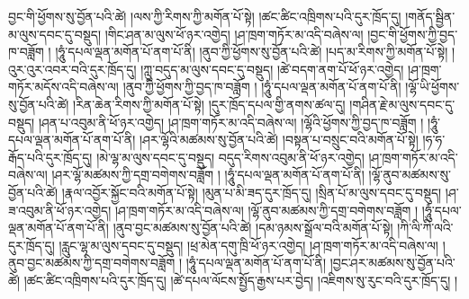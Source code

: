བྱང་གི་ཕྱོགས་སུ་བྱོན་པའི་ཚེ། །ལས་ཀྱི་རིགས་ཀྱི་མགོན་པོ་སྟེ། །ཚང་ཚིང་འཁྲིགས་པའི་དུར་ཁྲོད་དུ། །གནོད་སྦྱིན་མ་ལུས་དབང་དུ་བསྡུད། །གིང་ཤན་མ་ལུས་ཕོ་ཉར་འགྱེད། །ཤ་ཁྲག་གཏོར་མ་འདི་བཞེས་ལ། །བྱང་གི་ཕྱོགས་ཀྱི་བྱད་ཁ་བཟློག ། །ཧཱུཾ་དཔལ་ལྡན་མགོན་པོ་ནག་པོ་ནི། །ནུབ་ཀྱི་ཕྱོགས་སུ་བྱོན་པའི་ཚེ། །པད་མ་རིགས་ཀྱི་མགོན་པོ་སྟེ། །འུར་འུར་འབར་བའི་དུར་ཁྲོད་དུ། །ཀླུ་བདུད་མ་ལུས་དབང་དུ་བསྡུད། །ཚེ་བདག་ནག་པོ་ཕོ་ཉར་འགྱེད། །ཤ་ཁྲག་གཏོར་མདོས་འདི་བཞེས་ལ། །ནུབ་ཀྱི་ཕྱོགས་ཀྱི་བྱད་ཁ་བཟློག ། །ཧཱུཾ་དཔལ་ལྡན་མགོན་པོ་ནག་པོ་ནི། །ལྷོ་ཡི་ཕྱོགས་སུ་བྱོན་པའི་ཚེ། །རིན་ཆེན་རིགས་ཀྱི་མགོན་པོ་སྟེ། །དུར་ཁྲོད་དཔལ་གྱི་ནགས་ཚལ་དུ། །གཤིན་རྗེ་མ་ལུས་དབང་དུ་བསྡུད། །ཤན་པ་འབུམ་ནི་ཕོ་ཉར་འགྱེད། །ཤ་ཁྲག་གཏོར་མ་འདི་བཞེས་ལ། །ལྷོའི་ཕྱོགས་ཀྱི་བྱད་ཁ་བཟློག ། །ཧཱུཾ་དཔལ་ལྡན་མགོན་པོ་ནག་པོ་ནི། །ཤར་ལྷོའི་མཚམས་སུ་བྱོན་པའི་ཚེ། །བསྟན་པ་བསྲུང་བའི་མགོན་པོ་སྟེ། །ཧ་ཧ་རྒོད་པའི་དུར་ཁྲོད་དུ། །མེ་ལྷ་མ་ལུས་དབང་དུ་བསྡུད། བདུད་རིགས་འབུམ་ནི་ཕོ་ཉར་འགྱེད། །ཤ་ཁྲག་གཏོར་མ་འདི་བཞེས་ལ། །ཤར་ལྷོ་མཚམས་ཀྱི་དགྲ་བགེགས་བཟློག ། །ཧཱུཾ་དཔལ་ལྡན་མགོན་པོ་ནག་པོ་ནི། །ལྷོ་ནུབ་མཚམས་སུ་བྱོན་པའི་ཚེ། །རྣལ་འབྱོར་སྐྱོང་བའི་མགོན་པོ་སྟེ། །མུན་པ་མི་ཟད་དུར་ཁྲོད་དུ། །སྲིན་པོ་མ་ལུས་དབང་དུ་བསྡུད། །ཤ་ཟ་འབུམ་ནི་ཕོ་ཉར་འགྱེད། །ཤ་ཁྲག་གཏོར་མ་འདི་བཞེས་ལ། །ལྷོ་ནུབ་མཚམས་ཀྱི་དགྲ་བགེགས་བཟློག ། །ཧཱུཾ་དཔལ་ལྡན་མགོན་པོ་ནག་པོ་ནི། །ནུབ་བྱང་མཚམས་སུ་བྱོན་པའི་ཚེ། །དམ་ཉམས་སྒྲོལ་བའི་མགོན་པོ་སྟེ། །ཀི་ལི་ཀི་ལའི་དུར་ཁྲོད་དུ། །རླུང་ལྷ་མ་ལུས་དབང་དུ་བསྡུད། །ཕྲ་མེན་དགུ་ཁྲི་ཕོ་ཉར་འགྱེད། །ཤ་ཁྲག་གཏོར་མ་འདི་བཞེས་ལ། །ནུབ་བྱང་མཚམས་ཀྱི་དགྲ་བགེགས་བཟློག ། །ཧཱུཾ་དཔལ་ལྡན་མགོན་པོ་ནག་པོ་ནི། །བྱང་ཤར་མཚམས་སུ་བྱོན་པའི་ཚེ། །ཚང་ཚིང་འཁྲིགས་པའི་དུར་ཁྲོད་དུ། །ཚེ་དཔལ་ལོངས་སྤྱོད་རྒྱས་པར་བྱེད། །འཇིགས་སུ་རུང་བའི་དུར་ཁྲོད་དུ། །
